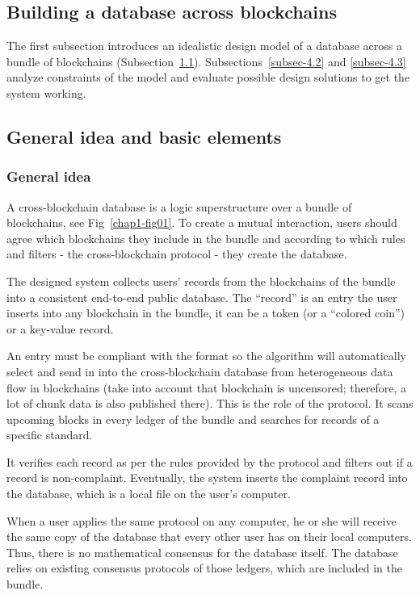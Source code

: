 \begin{multicols}{2}
\section{Building a database across blockchains}\label{sec-4}

The first subsection introduces an idealistic design model of a database across a bundle of blockchains (Subsection~\ref{subsec-4.1}). Subsections~\ref{subsec-4.2} and \ref{subsec-4.3} analyze constraints of the model and evaluate possible design solutions to get the system working.

\subsection{General idea and basic elements}\label{subsec-4.1}


\subsubsection{General idea}\label{subsubsec-4.1.1}

A cross-blockchain database is a logic superstructure over a bundle of blockchains, see Fig~\ref{chap1-fig01}. To create a mutual interaction, users should agree which blockchains they include in the bundle and according to which rules and filters - the cross-blockchain protocol - they create the database.

The designed system collects users’ records from the blockchains of the bundle into a consistent end-to-end public database. The “record” is an entry the user inserts into any blockchain in the bundle, it can be a token (or a “colored coin”) or a key-value record.

An entry must be compliant with the format so the algorithm will automatically select and send in into the cross-blockchain database from heterogeneous data flow in blockchains (take into account that blockchain is uncensored; therefore, a lot of chunk data is also published there). This is the role of the protocol. It scans upcoming blocks in every ledger of the bundle and searches for records of a specific standard. 

It verifies each record as per the rules provided by the protocol and filters out if a record is non-complaint. Eventually, the system inserts the complaint record into the database, which is a local file on the user’s computer.

When a user applies the same protocol on any computer, he or she will receive the same copy of the database that every other user has on their local computers. Thus, there is no mathematical consensus for the database itself. The database relies on existing consensus protocols of those ledgers, which are included in the bundle. 


\end{multicols}
